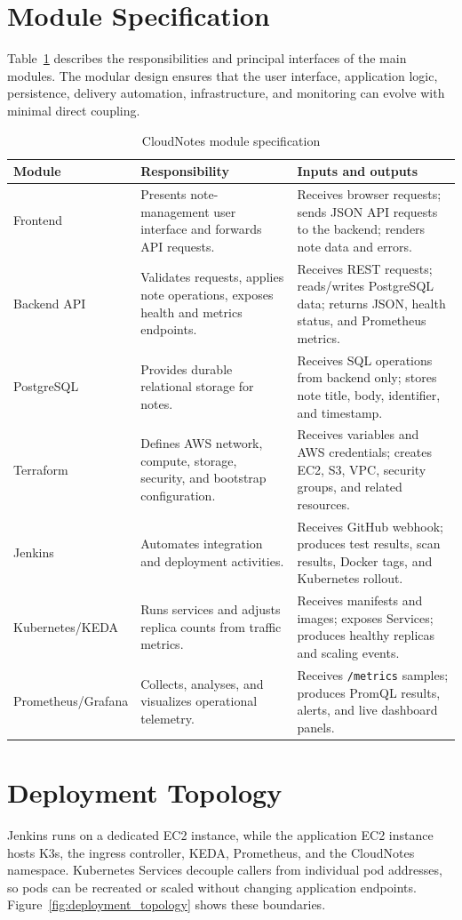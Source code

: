 \documentclass[12pt,a4paper]{article}
\begin{document}
\section{Module Specification}
Table~\ref{tab:modules} describes the responsibilities and principal interfaces of the main modules. The modular design ensures that the user interface, application logic, persistence, delivery automation, infrastructure, and monitoring can evolve with minimal direct coupling.

\begin{table}[htbp]
\caption{CloudNotes module specification}
\label{tab:modules}
\centering
\begin{tabular}{p{}p{}p{}}
\hline
\textbf{Module} & \textbf{Responsibility} & \textbf{Inputs and outputs} \\
\hline
Frontend & Presents note-management user interface and forwards API requests. & Receives browser requests; sends JSON API requests to the backend; renders note data and errors. \\
Backend API & Validates requests, applies note operations, exposes health and metrics endpoints. & Receives REST requests; reads/writes PostgreSQL data; returns JSON, health status, and Prometheus metrics. \\
PostgreSQL & Provides durable relational storage for notes. & Receives SQL operations from backend only; stores note title, body, identifier, and timestamp. \\
Terraform & Defines AWS network, compute, storage, security, and bootstrap configuration. & Receives variables and AWS credentials; creates EC2, S3, VPC, security groups, and related resources. \\
Jenkins & Automates integration and deployment activities. & Receives GitHub webhook; produces test results, scan results, Docker tags, and Kubernetes rollout. \\
Kubernetes/KEDA & Runs services and adjusts replica counts from traffic metrics. & Receives manifests and images; exposes Services; produces healthy replicas and scaling events. \\
Prometheus/Grafana & Collects, analyses, and visualizes operational telemetry. & Receives \texttt{/metrics} samples; produces PromQL results, alerts, and live dashboard panels. \\
\hline
\end{tabular}
\end{table}

\section{Deployment Topology}
Jenkins runs on a dedicated EC2 instance, while the application EC2 instance hosts K3s, the ingress controller, KEDA, Prometheus, and the CloudNotes namespace. Kubernetes Services decouple callers from individual pod addresses, so pods can be recreated or scaled without changing application endpoints. Figure~\ref{fig:deployment_topology} shows these boundaries.
\end{document}
